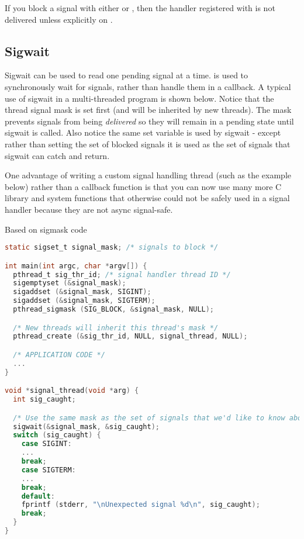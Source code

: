 If you block a signal with either  or , then the handler registered with  is not delivered unless explicitly  on .

\subsection{Sigwait}

Sigwait can be used to read one pending signal at a time.
 is used to synchronously wait for signals, rather than handle them in a callback.
A typical use of sigwait in a multi-threaded program is shown below.
Notice that the thread signal mask is set first (and will be inherited by new threads).
The mask prevents signals from being \emph{delivered} so they will remain in a pending state until sigwait is called.
Also notice the same set  variable is used by sigwait - except rather than setting the set of blocked signals it is used as the set of signals that sigwait can catch and return.

One advantage of writing a custom signal handling thread (such as the example below) rather than a callback function is that you can now use many more C library and system functions that otherwise could not be safely used in a signal handler because they are not async signal-safe.

Based on sigmask code \cite{pthread_sigmask}

\begin{lstlisting}[language=C]
static sigset_t signal_mask; /* signals to block */

int main(int argc, char *argv[]) {
  pthread_t sig_thr_id; /* signal handler thread ID */
  sigemptyset (&signal_mask);
  sigaddset (&signal_mask, SIGINT);
  sigaddset (&signal_mask, SIGTERM);
  pthread_sigmask (SIG_BLOCK, &signal_mask, NULL);

  /* New threads will inherit this thread's mask */
  pthread_create (&sig_thr_id, NULL, signal_thread, NULL);

  /* APPLICATION CODE */
  ...
}

void *signal_thread(void *arg) {
  int sig_caught;

  /* Use the same mask as the set of signals that we'd like to know about! */
  sigwait(&signal_mask, &sig_caught);
  switch (sig_caught) {
    case SIGINT:
    ...
    break;
    case SIGTERM:
    ...
    break;
    default:
    fprintf (stderr, "\nUnexpected signal %d\n", sig_caught);
    break;
  }
}
\end{lstlisting}

